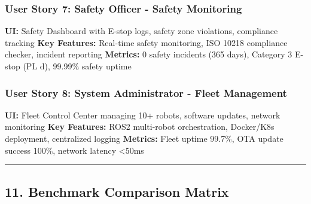 \documentclass[
]{article}
\begin{document}
\hypertarget{user-story-7-safety-officer---safety-monitoring}{%
\subsubsection{User Story 7: Safety Officer - Safety
Monitoring}\label{user-story-7-safety-officer---safety-monitoring}}

\textbf{UI:} Safety Dashboard with E-stop logs, safety zone violations,
compliance tracking \textbf{Key Features:} Real-time safety monitoring,
ISO 10218 compliance checker, incident reporting \textbf{Metrics:} 0
safety incidents (365 days), Category 3 E-stop (PL d), 99.99\% safety
uptime

\hypertarget{user-story-8-system-administrator---fleet-management}{%
\subsubsection{User Story 8: System Administrator - Fleet
Management}\label{user-story-8-system-administrator---fleet-management}}

\textbf{UI:} Fleet Control Center managing 10+ robots, software updates,
network monitoring \textbf{Key Features:} ROS2 multi-robot
orchestration, Docker/K8s deployment, centralized logging
\textbf{Metrics:} Fleet uptime 99.7\%, OTA update success 100\%, network
latency \textless50ms

\begin{center}\rule{0.5\linewidth}{0.5pt}\end{center}

\hypertarget{benchmark-comparison-matrix}{%
\subsection{11. Benchmark Comparison
Matrix}\label{benchmark-comparison-matrix}}
\end{document}
